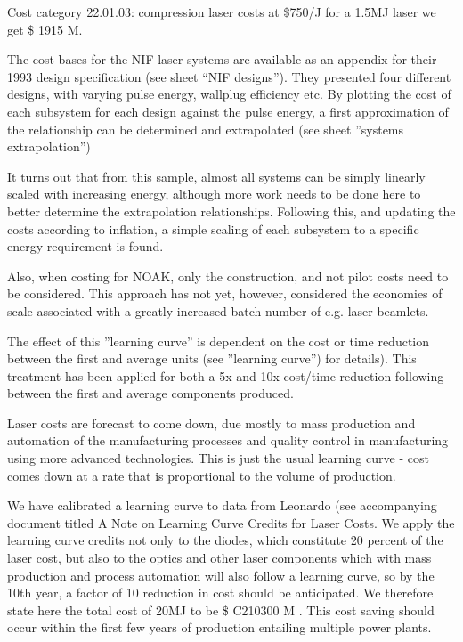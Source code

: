 Cost category 22.01.03: compression laser costs at  \$750/J for a 1.5MJ laser we get \$ 1915 M.


The cost bases for the NIF laser systems are available 
as an appendix for their 1993 design specification (see sheet ``NIF designs''). They presented four different designs, with varying pulse energy, wallplug efficiency etc. By plotting the cost of each subsystem for each design against the pulse energy, a first approximation of the relationship  can be determined and extrapolated (see sheet ''systems extrapolation'')

It turns out that from this sample, almost all systems can be simply linearly scaled with increasing energy, although more work  needs to be done here to better determine the extrapolation relationships.  Following this, and updating the costs according to inflation, a simple scaling of each subsystem to a specific energy requirement is found.

Also, when costing for NOAK, only the construction, and not pilot costs need to be considered. This approach has not yet, however, considered the economies of scale associated with a greatly increased batch 
number of e.g. laser beamlets.

The effect of this ''learning curve'' is dependent on the cost or time reduction between the first and average units (see ''learning curve'') for details). This treatment has been applied for both a 5x and 10x cost/time 
reduction following between the first and average components produced.

Laser costs are forecast to come down, due mostly to mass production and automation of the manufacturing processes and quality control in manufacturing using more advanced technologies. This is just the usual learning curve - cost comes down at a rate that is proportional to the volume of production. 

We have calibrated a learning curve to data from Leonardo (see accompanying document titled A Note on Learning Curve Credits for Laser Costs. We apply the learning curve credits not only to the diodes, which constitute 20 percent of the laser cost, but also to the optics and other laser components which with mass production and process automation will also follow a learning curve, so by the 10th year, a factor of 10 reduction in cost should be anticipated.  We therefore state here the total cost of 20MJ to be \$ C210300 M .  This cost saving should occur within the first few years of production entailing multiple power plants.

